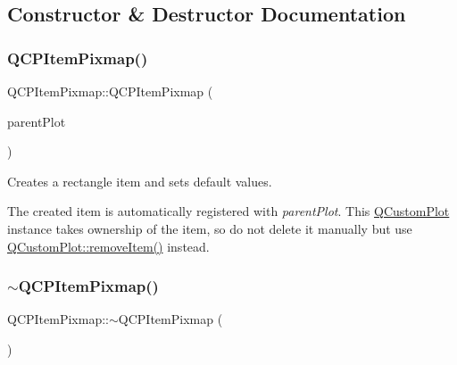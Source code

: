 \subsection{Constructor \& Destructor Documentation}
\mbox{\label{class_q_c_p_item_pixmap_aa6de42a37261b21a5480e7da122345c3}} 
\subsubsection{\texorpdfstring{Q\+C\+P\+Item\+Pixmap()}{QCPItemPixmap()}}
{\footnotesize\ttfamily Q\+C\+P\+Item\+Pixmap\+::\+Q\+C\+P\+Item\+Pixmap (\begin{DoxyParamCaption}\item[{\hyperlink{class_q_custom_plot}{Q\+Custom\+Plot} $\ast$}]{parent\+Plot }\end{DoxyParamCaption})\hspace{0.3cm}{\ttfamily [explicit]}}

Creates a rectangle item and sets default values.

The created item is automatically registered with {\itshape parent\+Plot}. This \hyperlink{class_q_custom_plot}{Q\+Custom\+Plot} instance takes ownership of the item, so do not delete it manually but use \hyperlink{class_q_custom_plot_ae04446557292551e8fb6e2c106e1848d}{Q\+Custom\+Plot\+::remove\+Item()} instead. \mbox{\label{class_q_c_p_item_pixmap_a810cac6a409d963cda6ea2d3152f1fd0}} 
\subsubsection{\texorpdfstring{$\sim$\+Q\+C\+P\+Item\+Pixmap()}{~QCPItemPixmap()}}
{\footnotesize\ttfamily Q\+C\+P\+Item\+Pixmap\+::$\sim$\+Q\+C\+P\+Item\+Pixmap (\begin{DoxyParamCaption}{ }\end{DoxyParamCaption})\hspace{0.3cm}{\ttfamily [virtual]}}



